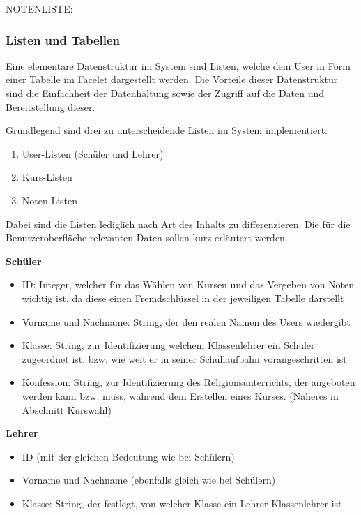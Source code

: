 NOTENLISTE:
	


\subsubsection{Listen und Tabellen}

Eine elementare Datenstruktur im System sind Listen, welche dem User in Form einer Tabelle im Facelet dargestellt werden.
Die Vorteile dieser Datenstruktur sind die Einfachheit der Datenhaltung sowie der Zugriff auf die Daten und Bereitstellung dieser.

Grundlegend sind drei zu unterscheidende Listen im System implementiert:
\begin{enumerate}
  \item User-Listen (Schüler und Lehrer)
  \item Kurs-Listen
  \item Noten-Listen
\end{enumerate}

Dabei sind die Listen lediglich nach Art des Inhalts zu differenzieren. 
Die für die Benutzeroberfläche relevanten Daten sollen kurz erläutert werden. 

\textbf{Schüler}
\begin{itemize}
  \item ID: Integer, welcher für das Wählen von Kursen und das Vergeben von Noten wichtig ist, da diese einen Fremdschlüssel in der jeweiligen Tabelle darstellt
  \item Vorname und Nachname: String, der den realen Namen des Users wiedergibt
  \item Klasse: String, zur Identifizierung welchem Klassenlehrer ein Schüler zugeordnet ist, bzw. wie weit er in seiner Schullaufbahn vorangeschritten ist
  \item Konfession: String, zur Identifizierung des Religionsunterrichts, der angeboten werden kann bzw. muss, während dem Erstellen eines Kurses. (Näheres in Abschnitt Kurswahl)
\end{itemize}

\textbf{Lehrer}
\begin{itemize}
  \item ID (mit der gleichen Bedeutung wie bei Schülern)
  \item Vorname und Nachname (ebenfalls gleich wie bei Schülern)
  \item Klasse: String, der festlegt, von welcher Klasse ein Lehrer Klassenlehrer ist
\end{itemize}

